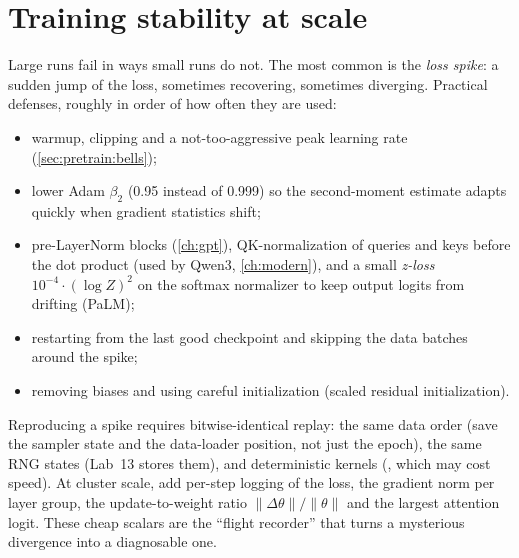 \section{Training stability at scale}\label{sec:pretrain:stability}

Large runs fail in ways small runs do not. The most common is the \emph{loss spike}: a sudden
jump of the loss, sometimes recovering, sometimes diverging. Practical defenses, roughly in
order of how often they are used:
\begin{itemize}
\item warmup, clipping and a not-too-aggressive peak learning rate (\cref{sec:pretrain:bells});
\item lower Adam $\beta_2$ (0.95 instead of 0.999) so the second-moment estimate adapts quickly
  when gradient statistics shift;
\item pre-LayerNorm blocks (\cref{ch:gpt}), QK-normalization of queries and keys before the dot
  product (used by Qwen3, \cref{ch:modern}), and a small \emph{z-loss} $10^{-4}\cdot(\log Z)^2$ on
  the softmax normalizer to keep output logits from drifting (PaLM);
\item restarting from the last good checkpoint and skipping the data batches around the spike;
\item removing biases and using careful initialization (scaled residual initialization).
\end{itemize}

\begin{systemslens}
Reproducing a spike requires bitwise-identical replay: the same data order (save the sampler
state and the data-loader position, not just the epoch), the same RNG states (Lab~13 stores
them), and deterministic kernels (, which may
cost speed). At cluster scale, add per-step logging of the loss, the gradient norm per layer
group, the update-to-weight ratio $\|\Delta\theta\|/\|\theta\|$ and the largest attention logit.
These cheap scalars are the ``flight recorder'' that turns a mysterious divergence into a
diagnosable one.
\end{systemslens}

